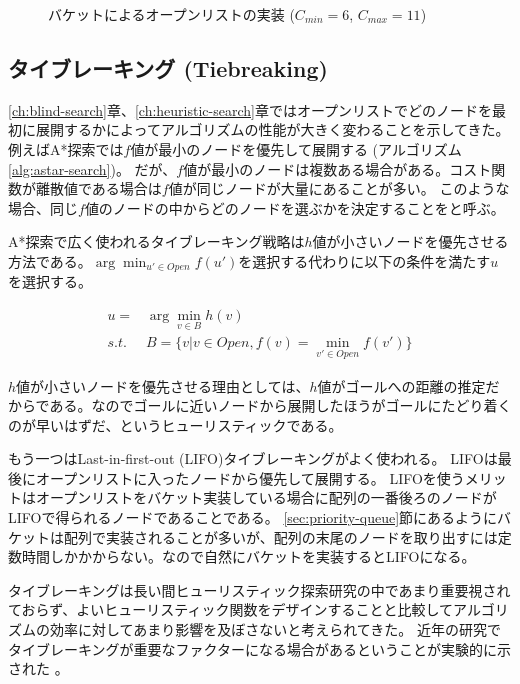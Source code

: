 \begin{figure}
  \centering
  \begin{tikzpicture}[scale=0.6]
    
  \end{tikzpicture}
  \caption{バケットによるオープンリストの実装 ($C_{min} = 6$, $C_{max} = 11$)}
  \label{fig:bucket}
\end{figure}


\subsection{タイブレーキング (Tiebreaking)}
\label{sec:tiebreaking}

\ref{ch:blind-search}章、\ref{ch:heuristic-search}章ではオープンリストでどのノードを最初に展開するかによってアルゴリズムの性能が大きく変わることを示してきた。
例えばA*探索では$f$値が最小のノードを優先して展開する (アルゴリズム\ref{alg:astar-search})。
だが、$f$値が最小のノードは複数ある場合がある。コスト関数が離散値である場合は$f$値が同じノードが大量にあることが多い。
このような場合、同じ$f$値のノードの中からどのノードを選ぶかを決定することをと呼ぶ。

A*探索で広く使われるタイブレーキング戦略は$h$値が小さいノードを優先させる方法である。$\arg \min_{u' \in Open} f(u')$を選択する代わりに以下の条件を満たす$u$を選択する。

\begin{align*}
  u =& \arg \min_{v \in B} h(v) \\
  s.t. \; \; & B = \{v | v \in Open, f(v) = \min_{v' \in Open} f(v')\}
\end{align*}

$h$値が小さいノードを優先させる理由としては、$h$値がゴールへの距離の推定だからである。なのでゴールに近いノードから展開したほうがゴールにたどり着くのが早いはずだ、というヒューリスティックである。

もう一つはLast-in-first-out (LIFO)タイブレーキングがよく使われる。
LIFOは最後にオープンリストに入ったノードから優先して展開する。
LIFOを使うメリットはオープンリストをバケット実装している場合に配列の一番後ろのノードがLIFOで得られるノードであることである。
\ref{sec:priority-queue}節にあるようにバケットは配列で実装されることが多いが、配列の末尾のノードを取り出すには定数時間しかかからない。なので自然にバケットを実装するとLIFOになる。


タイブレーキングは長い間ヒューリスティック探索研究の中であまり重要視されておらず、よいヒューリスティック関数をデザインすることと比較してアルゴリズムの効率に対してあまり影響を及ぼさないと考えられてきた。
近年の研究でタイブレーキングが重要なファクターになる場合があるということが実験的に示された \cite{asai2016tiebreaking}。


